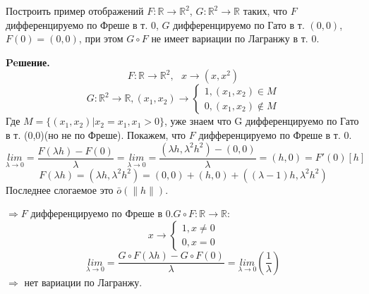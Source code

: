 \begin{task}
    Построить пример отображений $F:\mathbb{R}\rightarrow \mathbb{R}^2$, $G:\mathbb{R}^2\rightarrow \mathbb{R}$ таких, что $F$ дифференцируемо по Фреше в т. $0$, $G$ дифференцируемо по Гато в т. $(0,0)$, $F(0)=(0,0)$, при этом $G \circ F$ не имеет вариации по Лагранжу в т. 0.
    
    \textbf{Peшение.} 
    $$F:\mathbb{R}\rightarrow \mathbb{R}^2, \ \ \ x \rightarrow (x,x^2)$$
    \begin{equation*}
    G:\mathbb{R}^2\rightarrow \mathbb{R}, (x_1,x_2)\rightarrow
    \begin{cases}
        1, (x_1,x_2)\in M \\0, (x_1,x_2)\notin M
    \end{cases}
    \end{equation*}
    Где $M=\{ (x_1,x_2)|x_2=x_1,x_1>0\}$, уже знаем что G дифференцируемо по Гато в т. (0,0)(но не по Фреше). Покажем, что $F$ дифференцируемо по Фреше в т. 0.
    $$\underset{\lambda\rightarrow0}{lim}=\frac{F(\lambda h)-F (0)}{\lambda}=\underset{\lambda\rightarrow0}{lim}=\frac{(\lambda h,\lambda^2 h^2)-(0,0)}{\lambda}=(h,0)=F'(0)[h]$$
    $$F(\lambda h)=(\lambda h,\lambda^2 h^2)=(0,0)+(h,0)+((\lambda-1)h,\lambda^2 h^2)$$
    Последнее слогаемое это $\bar{o}(\|h \|)$.
    
    \noindent $\Rightarrow F$ дифференцируемо по Фреше в 0.$G \circ F:\mathbb{R}\rightarrow\mathbb{R}$:
     \begin{equation*}
    x\rightarrow
    \begin{cases}
        1, x\neq0\\0, x=0
    \end{cases}
    \end{equation*}
    $$\underset{\lambda\rightarrow0}{lim}=\frac{G \circ F(\lambda h)-G \circ F(0)}{\lambda}=\underset{\lambda\rightarrow0}{lim} \left( \frac{1}{\lambda} \right) $$
    $\Rightarrow$ нет вариации по Лагранжу.
    \end{task}